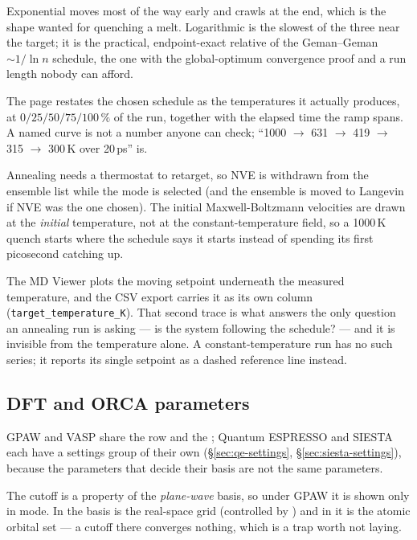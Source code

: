 Exponential moves most of the way early and crawls at the end, which is
the shape wanted for quenching a melt. Logarithmic is the slowest of the
three near the target; it is the practical, endpoint-exact relative of
the Geman--Geman $\sim 1/\ln n$ schedule, the one with the
global-optimum convergence proof and a run length nobody can afford.

The page restates the chosen schedule as the temperatures it actually
produces, at $0/25/50/75/100\,\%$ of the run, together with the elapsed
time the ramp spans. A named curve is not a number anyone can check;
``1000 $\to$ 631 $\to$ 419 $\to$ 315 $\to$ 300\,K over 20\,ps'' is.

\begin{calnote}
Annealing needs a thermostat to retarget, so NVE is withdrawn from the
ensemble list while the mode is selected (and the ensemble is moved to
Langevin if NVE was the one chosen). The initial Maxwell-Boltzmann
velocities are drawn at the \emph{initial} temperature, not at the
constant-temperature field, so a 1000\,K quench starts where the schedule
says it starts instead of spending its first picosecond catching up.
\end{calnote}

\begin{caltip}
The MD Viewer plots the moving setpoint underneath the measured
temperature, and the CSV export carries it as its own column
(\texttt{target\_temperature\_K}). That second trace is what answers the
only question an annealing run is asking --- is the system following the
schedule? --- and it is invisible from the temperature alone. A
constant-temperature run has no such series; it reports its single
setpoint as a dashed reference line instead.
\end{caltip}

\subsection{DFT and ORCA parameters}

GPAW and VASP share the  row and the ;
Quantum ESPRESSO and SIESTA each have a settings group of their own
(\S\ref{sec:qe-settings}, \S\ref{sec:siesta-settings}), because the parameters
that decide their basis are not the same parameters.

The cutoff is a property of the \emph{plane-wave} basis, so under GPAW it is
shown only in  mode. In  the basis is the real-space grid
(controlled by ) and in  it is the atomic orbital
set --- a cutoff there converges nothing, which is a trap worth not laying.


